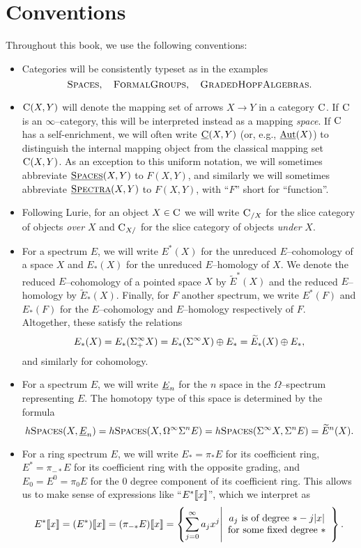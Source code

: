 
\section{Conventions}

Throughout this book, we use the following conventions:

\begin{itemize}
\item Categories will be consistently typeset as in the examples \[\normalfont\textsc{Spaces}, \quad \normalfont\textsc{FormalGroups}, \quad \normalfont\textsc{GradedHopfAlgebras}.\]
\item $\normalfont\textsc{C}(X, Y)$ will denote the mapping set of arrows $X \to Y$ in a category $\normalfont\textsc{C}$.  If $\normalfont\textsc{C}$ is an $\infty$--category, this will be interpreted instead as a mapping \emph{space}.  If $\normalfont\textsc{C}$ has a self-enrichment, we will often write $\underline{\normalfont\textsc{C}}(X, Y)$ (or, e.g., $\operatorname{\underline{\smash{\operatorname{Aut}}}}(X)$) to distinguish the internal mapping object from the classical mapping set $\normalfont\textsc{C}(X, Y)$.  As an exception to this uniform notation, we will sometimes abbreviate $\underline{\normalfont\textsc{Spaces}}(X, Y)$ to $F(X, Y)$, and similarly we will sometimes abbreviate $\underline{\normalfont\textsc{Spectra}}(X, Y)$ to $F(X, Y)$, with ``$F$'' short for ``function''.
\item Following Lurie, for an object $X \in \normalfont\textsc{C}$ we will write $\normalfont\textsc{C}_{/X}$ for the slice category of objects \emph{over} $X$ and $\normalfont\textsc{C}_{X/}$ for the slice category of objects \emph{under} $X$.
\item For a spectrum $E$, we will write $E^*(X)$ for the unreduced $E$--cohomology of a space $X$ and $E_*(X)$ for the unreduced $E$--homology of $X$.  We denote the reduced $E$--cohomology of a pointed space $X$ by $\widetilde E^*(X)$ and the reduced $E$--homology by $\widetilde E_*(X)$.  Finally, for $F$ another spectrum, we write $E^*(F)$ and $E_*(F)$ for the $E$--cohomology and $E$--homology respectively of $F$.  Altogether, these satisfy the relations \[E_*(X) = E_*(\Sigma^\infty_+ X) = E_*(\Sigma^\infty X) \oplus E_* = \widetilde E_*(X) \oplus E_*,\] and similarly for cohomology.
\item For a spectrum $E$, we will write $\underline{\smash{E}}_{n}$ for the $n${\th} space in the $\Omega$--spectrum representing $E$.  The homotopy type of this space is determined by the formula \[h\normalfont\textsc{Spaces}(X, \underline{\smash{E}}_{n}) = h\normalfont\textsc{Spaces}(X, \Omega^\infty \Sigma^n E) = h\normalfont\textsc{Spaces}(\Sigma^\infty X, \Sigma^n E) = \widetilde E^n(X).\]
\item For a ring spectrum $E$, we will write $E_* = \pi_* E$ for its coefficient ring, $E^* = \pi_{-*} E$ for its coefficient ring with the opposite grading, and $E_0 = E^0 = \pi_0 E$ for the $0${\th} degree component of its coefficient ring.  This allows us to make sense of expressions like ``$E^*\llbracket{x}\rrbracket$'', which we interpret as \[E^*\llbracket{x}\rrbracket = (E^*)\llbracket{x}\rrbracket = (\pi_{-*} E)\llbracket{x}\rrbracket = \left\{ \sum_{j=0}^\infty a_j x^j \middle| \begin{array}{c} \text{$a_j$ is of degree $* -j|x|$} \\ \text{for some fixed degree $*$} \end{array} \right\}.\]

\end{itemize}
